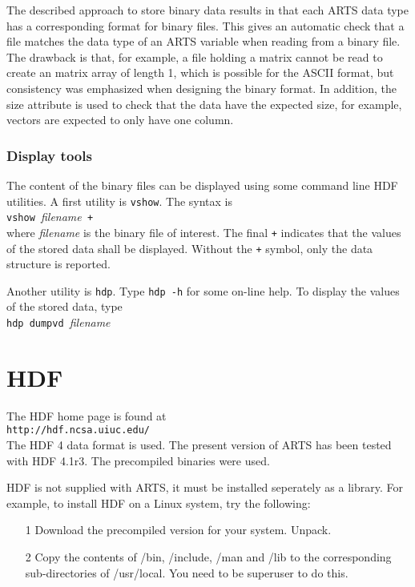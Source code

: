  The described approach to store binary data results in that each
 ARTS data type has a corresponding format for binary files. This 
 gives an automatic check that a file matches the data type of
 an ARTS variable when reading from a binary file. The drawback
 is that, for example, a file holding a matrix cannot be read to create
 an matrix array of length 1, which is possible for the ASCII format,
 but consistency was emphasized when designing the binary format.
 In addition, the size attribute is used to check that the data
 have the expected size, for example, vectors are expected to only
 have one column.
 

\subsubsection{Display tools}
 \label{sec:formats:file:binary:display}

 The content of the binary files can be displayed using some command
 line HDF utilities. A first utility is
 \verb|vshow|. The syntax is \\

 \verb|vshow |{\it filename}\verb| +| \\

 \noindent
 where {\it filename} is the binary file of interest. The final \verb|+|
 indicates that the values of the stored data shall be displayed. Without
 the \verb|+| symbol, only the data structure is reported.

 Another utility is \verb|hdp|. Type \verb|hdp -h| for some on-line help.
 To display the values of the stored data, type\\
 
 \verb|hdp dumpvd |{\it filename}



\section{HDF}
 \label{sec:formats:hdf}

 The HDF home page is found at \\

 \verb|http://hdf.ncsa.uiuc.edu/| \\

 \noindent
 The HDF 4 data format is used. The present version of ARTS has been
 tested with HDF 4.1r3. The precompiled binaries were used.
 
 HDF is not supplied with ARTS, it must be installed seperately as a
 library. For example, to install HDF on a Linux system, try the
 following:
 \begin{itemize}
  \item[1] Download the precompiled version for your system. Unpack.
  \item[2] Copy the contents of /bin, /include, /man and /lib to the 
           corresponding sub-directories of /usr/local. You need to be 
           superuser to do this.  
 \end{itemize}



